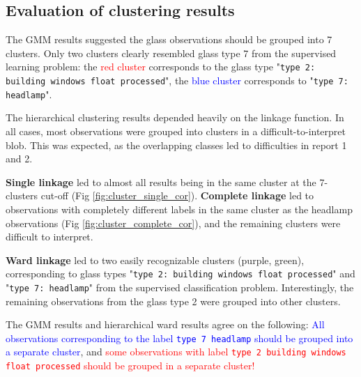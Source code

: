 \subsection{Evaluation of clustering results}

The GMM results suggested the glass observations should be grouped into 7 clusters. Only two clusters clearly resembled glass type 7 from the supervised learning problem: the \textcolor{red}{red cluster} corresponds to the glass type "\texttt{type 2: building windows float processed}", the \textcolor{blue}{blue cluster} corresponds to "\texttt{type 7: headlamp}".

The hierarchical clustering results depended heavily on the linkage function. In all cases, most observations were grouped into clusters in a difficult-to-interpret blob. This was expected, as the overlapping classes led to difficulties in report 1 and 2.

\textbf{Single linkage} led to almost all results being in the same cluster at the 7-clusters cut-off (Fig \ref{fig:cluster_single_cor}). \textbf{Complete linkage} led to observations with completely different labels in the same cluster as the headlamp observations (Fig \ref{fig:cluster_complete_cor}), and the remaining clusters were difficult to interpret.

\textbf{Ward linkage} led to two easily recognizable clusters (purple, green), corresponding to glass types "\texttt{type 2: building windows float processed}" and "\texttt{type 7: headlamp}" from the supervised classification problem. Interestingly, the remaining observations from the glass type 2 were grouped into other clusters.

The GMM results and hierarchical ward results agree on the following: \textcolor{blue}{All observations corresponding to the label \texttt{type 7 headlamp} should be grouped into a separate cluster}, and \textcolor{red}{some observations with label \texttt{type 2 building windows float processed} should be grouped in a separate cluster!}